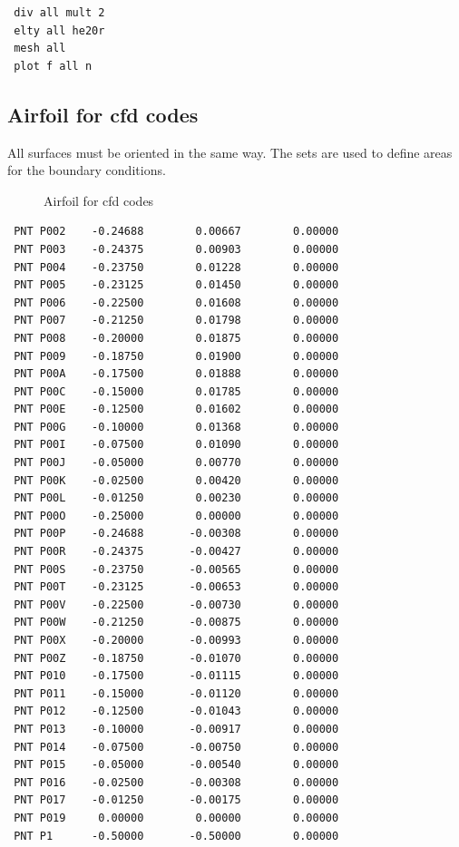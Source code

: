 \documentclass{article}
\begin{document}
\begin{appendix}
\begin{verbatim}
 div all mult 2
 elty all he20r
 mesh all
 plot f all n
\end{verbatim}


\subsection{\label{Airfoil for cfd codes}Airfoil for cfd codes}
All surfaces must be oriented in the same way. The sets are used to define areas for the boundary conditions.
\begin{figure}[h]
\caption{\label{Airfoil for duns}Airfoil for cfd codes }
\end{figure}
\begin{verbatim}
 PNT P002    -0.24688        0.00667        0.00000 
 PNT P003    -0.24375        0.00903        0.00000 
 PNT P004    -0.23750        0.01228        0.00000 
 PNT P005    -0.23125        0.01450        0.00000 
 PNT P006    -0.22500        0.01608        0.00000 
 PNT P007    -0.21250        0.01798        0.00000 
 PNT P008    -0.20000        0.01875        0.00000 
 PNT P009    -0.18750        0.01900        0.00000 
 PNT P00A    -0.17500        0.01888        0.00000 
 PNT P00C    -0.15000        0.01785        0.00000 
 PNT P00E    -0.12500        0.01602        0.00000 
 PNT P00G    -0.10000        0.01368        0.00000 
 PNT P00I    -0.07500        0.01090        0.00000 
 PNT P00J    -0.05000        0.00770        0.00000 
 PNT P00K    -0.02500        0.00420        0.00000 
 PNT P00L    -0.01250        0.00230        0.00000 
 PNT P00O    -0.25000        0.00000        0.00000 
 PNT P00P    -0.24688       -0.00308        0.00000 
 PNT P00R    -0.24375       -0.00427        0.00000 
 PNT P00S    -0.23750       -0.00565        0.00000 
 PNT P00T    -0.23125       -0.00653        0.00000 
 PNT P00V    -0.22500       -0.00730        0.00000 
 PNT P00W    -0.21250       -0.00875        0.00000 
 PNT P00X    -0.20000       -0.00993        0.00000 
 PNT P00Z    -0.18750       -0.01070        0.00000 
 PNT P010    -0.17500       -0.01115        0.00000 
 PNT P011    -0.15000       -0.01120        0.00000 
 PNT P012    -0.12500       -0.01043        0.00000 
 PNT P013    -0.10000       -0.00917        0.00000 
 PNT P014    -0.07500       -0.00750        0.00000 
 PNT P015    -0.05000       -0.00540        0.00000 
 PNT P016    -0.02500       -0.00308        0.00000 
 PNT P017    -0.01250       -0.00175        0.00000 
 PNT P019     0.00000        0.00000        0.00000 
 PNT P1      -0.50000       -0.50000        0.00000 

\end{verbatim}
\end{appendix}
\end{document}
